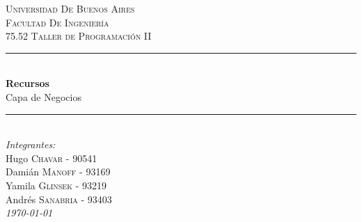 \documentclass{article}
\begin{document}
\begin{titlepage}

\newcommand{\HRule}{\rule{\linewidth}{0.5mm}} %

\center %
 

\textsc{\LARGE Universidad De Buenos Aires}\\[1.5cm] %
\textsc{\Large Facultad De Ingeniería}\\[0.5cm] %
\textsc{\large 75.52 Taller de Programaci\'on II}\\[0.5cm] %


\HRule \\[0.4cm]
{ \huge \bfseries Recursos}\\ Capa de Negocios\\[0.4cm] %
\HRule \\[1.5cm]
 

\Large \emph{Integrantes:}\\

Hugo \textsc{Chavar} - 90541\\ %
Dami\'an \textsc{Manoff} - 93169\\ %
Yamila \textsc{Glinsek} - 93219\\ %
Andr\'es \textsc{Sanabria} - 93403\\[5cm] %



{\large \text \em \today }\\[3cm] %
 

\vfill %

\end{titlepage}
\end{document}
